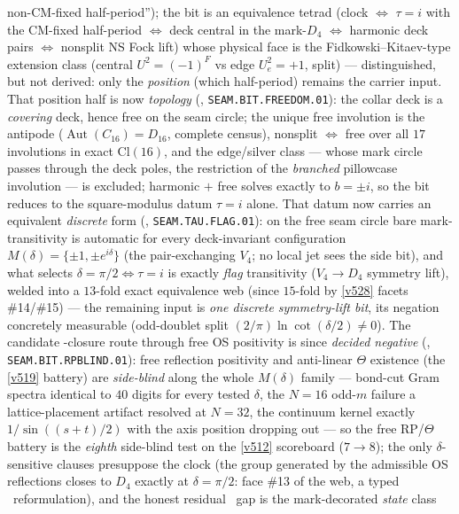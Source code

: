 non-CM-fixed half-period''); the bit is an equivalence tetrad (clock $\iff$ $\tau{=}i$ with the
CM-fixed half-period $\iff$ deck central in the mark-$D_4$ $\iff$ harmonic deck pairs $\iff$
nonsplit NS Fock lift) whose physical face is the Fidkowski--Kitaev-type extension class (central
$U^2=(-1)^F$ vs edge $U_e^2=+1$, split) --- distinguished, but not derived: only the
\emph{position} (which half-period) remains the carrier input. That position half is now
\emph{topology} (, \texttt{SEAM.BIT.FREEDOM.01}): the collar deck
is a \emph{covering} deck, hence free on the seam circle; the unique free involution is the antipode
($\operatorname{Aut}(C_{16})=D_{16}$, complete census), nonsplit $\iff$ free over all $17$
involutions in exact $\mathrm{Cl}(16)$, and the edge/silver class --- whose mark circle passes
through the deck poles, the restriction of the \emph{branched} pillowcase involution --- is
excluded; harmonic $+$ free solves exactly to $b=\pm i$, so the bit reduces to the square-modulus
datum $\tau=i$ alone. That datum now carries an equivalent \emph{discrete} form
(, \texttt{SEAM.TAU.FLAG.01}): on the free seam circle bare
mark-transitivity is automatic for every deck-invariant configuration $M(\delta)=\{\pm1,\pm
e^{i\delta}\}$ (the pair-exchanging $V_4$; no local jet sees the side bit), and what selects
$\delta=\pi/2\iff\tau=i$ is exactly \emph{flag} transitivity ($V_4\to D_4$ symmetry lift), welded
into a $13$-fold exact equivalence web (since $15$-fold by \vref{v528} facets \#14/\#15) --- the remaining input is \emph{one discrete symmetry-lift
bit}, its negation concretely measurable (odd-doublet split $(2/\pi)\ln\cot(\delta/2)\neq0$).
The candidate \mE-closure route through free OS positivity is since \emph{decided negative}
(, \texttt{SEAM.BIT.RPBLIND.01}): free reflection positivity
and anti-linear $\Theta$ existence (the \vref{v519} battery) are \emph{side-blind} along the whole
$M(\delta)$ family --- bond-cut Gram spectra identical to $40$ digits for every tested $\delta$,
the $N=16$ odd-$m$ failure a lattice-placement artifact resolved at $N=32$, the continuum kernel
exactly $1/\sin((s{+}t)/2)$ with the axis position dropping out --- so the free RP/$\Theta$ battery
is the \emph{eighth} side-blind test on the \vref{v512} scoreboard ($7\to8$); the only
$\delta$-sensitive clauses presuppose the clock (the group generated by the admissible OS
reflections closes to $D_4$ exactly at $\delta=\pi/2$: face \#13 of the web, a typed \mC\
reformulation), and the honest residual \mO\ gap is the mark-decorated \emph{state} class
